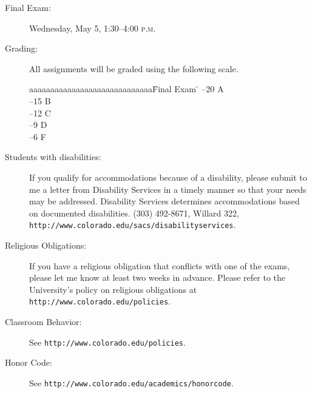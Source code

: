 \documentclass[11pt]{article}
\newcommand{\PM}{\textsc{p.m.}}
\newcommand{\url}[1]{\texttt{#1}}
\begin{document}
\begin{description}
\item[Final Exam: ]
Wednesday, May 5, 1:30--4:00 \PM


\item[Grading: ]
All assignments will be graded using the following scale.
\begin{tabbing}
aaaaaaaaaaaaaaaaaaaaaaaaaaaaa\quad    \=Final Exam \quad  \=    \kill
{}--20  \> A    \\
--15  \> B    \\
--12  \> C    \\
--9  \> D    \\
--6  \> F    \\
\end{tabbing}

\item[Students with disabilities: ]
If you qualify for accommodations because of a disability, please submit to me a letter from Disability Services in a timely manner so that your needs may be addressed.  Disability Services determines accommodations based on documented disabilities. (303) 492-8671, Willard 322, \url{http://www.colorado.edu/sacs/disabilityservices}.

\item[Religious Obligations: ]
If you have a religious obligation that conflicts with one of the exams, please let me know at least two weeks in advance. Please refer to the University's policy on religious obligations at \url{http://www.colorado.edu/policies}.

\item[Classroom Behavior: ]
 See \url{http://www.colorado.edu/policies}.

\item[Honor Code: ] See \url{http://www.colorado.edu/academics/honorcode}.
\end{description}
\end{document}
